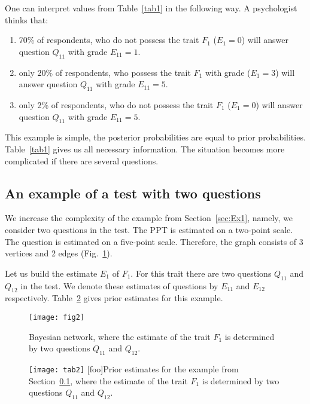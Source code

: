 \documentclass[12pt]{article}
\begin{document}
One can interpret values from Table~\ref{tab1} in the following way.  A psychologist thinks that:
\begin{enumerate}
\item 70\% of respondents, who do not possess the trait $F_1$ 
($E_1 = 0$) will answer question $Q_{11}$ with grade $E_{11}=1$.
\item only 20\% of respondents, who possess the trait $F_1$ with grade ($E_1 = 3$) will answer question $Q_{11}$ with grade $E_{11}=5$.
\item only 2\% of respondents, who do not possess the trait $F_1$ ($E_1 = 0$) will answer question $Q_{11}$ with grade $E_{11}=5$.
\end{enumerate}	

This example is simple, the posterior probabilities are equal to prior probabilities. Table~\ref{tab1} gives us all necessary information. The situation becomes more complicated if there are several questions.
%
\subsection{An example of a test with two questions}
\label{sec:Ex2}
We increase the complexity of the example from Section~\ref{sec:Ex1}, namely, we consider two questions in the test. The PPT is estimated on a two-point scale. The question is estimated on a five-point scale. Therefore, the graph consists of 3 vertices and 2 edges \cite{Mu:06} (Fig.~\ref{fig:fig2}).

Let us build the estimate $E_1$ of $F_1$. For this trait there are two questions $Q_{11}$ and $Q_{12}$ in the test. We denote these estimates of questions by $E_{11}$ and $E_{12}$ respectively. Table~\ref{tab2} gives prior estimates for this example.
%
\begin{figure}[!ht]
 \centering
  \texttt{[image: fig2]}
 \caption{Bayesian network, where the estimate of the trait $F_1$ is determined by two questions $Q_{11}$ and $Q_{12}$.}
  \label{fig:fig2}
\end{figure}

%
\begin{figure}[!ht]
\centering
\texttt{[image: tab2]}
[foo]{Prior estimates for the example from Section~\ref{sec:Ex2}, where the estimate of the trait $F_1$ is determined by two questions $Q_{11}$ and $Q_{12}$.}
 \label{tab2}
\end{figure}
\end{document}
